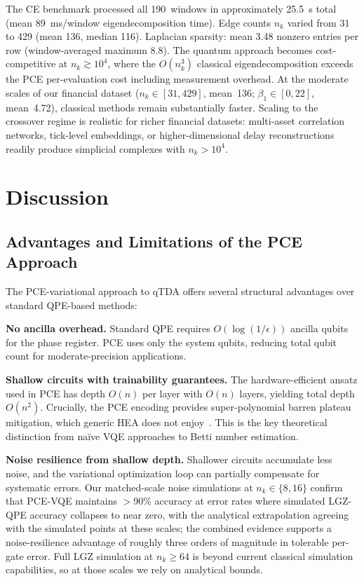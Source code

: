 \documentclass[conference,10pt]{IEEEtran}
\begin{document}
The CE benchmark processed all 190~windows in approximately 25.5~s
total (mean 89~ms/window eigendecomposition time). Edge counts $n_k$
varied from 31 to 429 (mean 136, median 116). Laplacian sparsity:
mean 3.48 nonzero entries per row (window-averaged maximum 8.8). The
quantum approach becomes cost-competitive at $n_k \gtrsim 10^4$,
where the $O(n_k^3)$ classical eigendecomposition exceeds the PCE
per-evaluation cost including measurement overhead. At the moderate
scales of our financial dataset ($n_k \in [31, 429]$, mean~136;
$\beta_1 \in [0, 22]$, mean~4.72), classical methods remain
substantially faster. Scaling to the crossover regime is realistic
for richer financial datasets: multi-asset correlation networks,
tick-level embeddings, or higher-dimensional delay reconstructions
readily produce simplicial complexes with $n_k > 10^4$.

\section{Discussion}\label{sec:discussion}

\subsection{Advantages and Limitations of the PCE Approach}

The PCE-variational approach to qTDA offers several structural
advantages over standard QPE-based methods:

\textbf{No ancilla overhead.} Standard QPE requires
$O(\log(1/\epsilon))$ ancilla qubits for the phase register. PCE uses
only the system qubits, reducing total qubit count for
moderate-precision applications.

\textbf{Shallow circuits with trainability guarantees.} The
hardware-efficient ansatz used in PCE has depth $O(n)$ per layer with
$O(n)$ layers, yielding total depth $O(n^2)$. Crucially, the PCE
encoding provides super-polynomial barren plateau mitigation, which
generic HEA does not enjoy~\cite{Cerezo21}. This is the key
theoretical distinction from na\"ive VQE approaches to Betti number
estimation.

\textbf{Noise resilience from shallow depth.} Shallower circuits
accumulate less noise, and the variational optimization loop can
partially compensate for systematic errors. Our matched-scale noise
simulations at $n_k \in \{8, 16\}$ confirm that PCE-VQE maintains
$>$90\% accuracy at error rates where simulated LGZ-QPE accuracy
collapses to near zero, with the analytical extrapolation agreeing
with the simulated points at these scales; the combined evidence
supports a noise-resilience advantage of roughly three orders of
magnitude in tolerable per-gate error. Full LGZ simulation at
$n_k \geq 64$ is beyond current classical simulation capabilities, so
at those scales we rely on analytical bounds.
\end{document}
